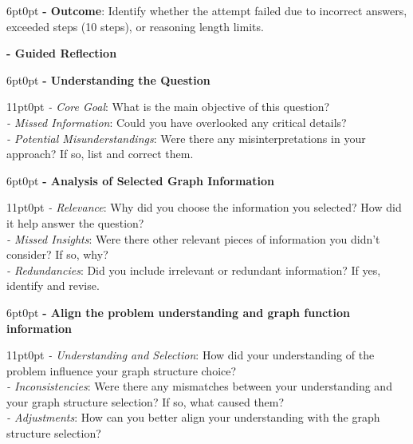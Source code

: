 \documentclass[11pt]{article}
\begin{document}
\begin{tcolorbox}[colback=white!10!white, colframe=blue!30!black, title=, boxrule=1pt]
\justifying
\noindent
\begin{adjustwidth}{6pt}{0pt}
\textbf{- Outcome}: Identify whether the attempt failed due to incorrect answers, exceeded steps (10 steps), or reasoning length limits.
\end{adjustwidth}
\textbf{- Guided Reflection}
\begin{adjustwidth}{6pt}{0pt}
\textbf{- Understanding the Question}
\end{adjustwidth}
\begin{adjustwidth}{11pt}{0pt}
 \textit{- Core Goal}: What is the main objective of this question?\\
 \textit{- Missed Information}: Could you have overlooked any critical details?\\
\textit{- Potential Misunderstandings}: Were there any misinterpretations in your approach? If so, list and correct them.
\end{adjustwidth}
\begin{adjustwidth}{6pt}{0pt}
\textbf{- Analysis of Selected Graph Information}
\end{adjustwidth}
\begin{adjustwidth}{11pt}{0pt}
  \textit{- Relevance}: Why did you choose the information you selected? How did it help answer the question?\\
 \textit{- Missed Insights}: Were there other relevant pieces of information you didn't consider? If so, why?\\
 \textit{ - Redundancies}: Did you include irrelevant or redundant information? If yes, identify and revise.
\end{adjustwidth}
\begin{adjustwidth}{6pt}{0pt}
\textbf{- Align the problem understanding and graph function information}
\end{adjustwidth}
\begin{adjustwidth}{11pt}{0pt}
  \textit{- Understanding and Selection}: How did your understanding of the problem influence your graph structure choice?\\
  \textit{- Inconsistencies}: Were there any mismatches between your understanding and your graph structure selection? If so, what caused them?\\
  \textit{- Adjustments}: How can you better align your understanding with the graph structure selection?
\end{adjustwidth}

\end{tcolorbox}
\end{document}
